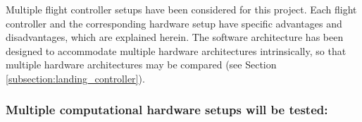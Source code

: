 Multiple flight controller setups have been considered for this project. Each flight controller and the corresponding hardware setup have specific advantages and disadvantages, which are explained herein. The software architecture has been designed to accommodate multiple hardware architectures intrinsically, so that multiple hardware architectures may be compared (see Section \ref{subsection:landing_controller}).



\subsubsection{Multiple computational hardware setups will be tested:}

